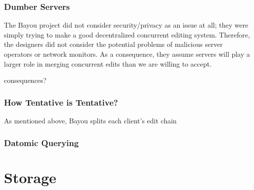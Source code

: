 \documentclass{article}
\begin{document}
\subsubsection{Dumber Servers}

The Bayou project did not consider security/privacy as an issue at all; they were simply trying to make a good decentralized concurrent editing system.
Therefore, the designers did not consider the potential problems of malicious server operators or network monitors.
As a consequence, they assume servers will play a larger role in merging concurrent edits than we are willing to accept.

consequences?

\subsubsection{How Tentative is Tentative?}

As mentioned above, Bayou splits each client's edit chain 

\subsubsection{Datomic Querying}

\section{Storage}
\end{document}
